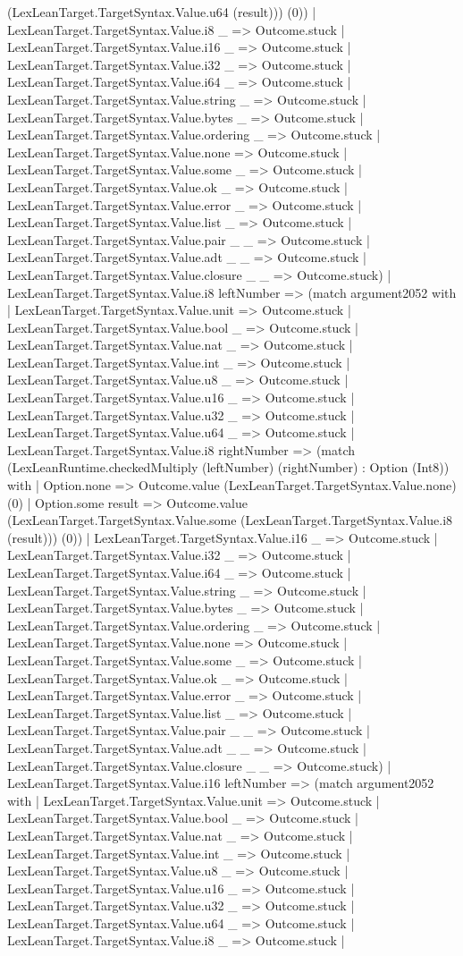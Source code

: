 \documentclass[11pt]{article}
\begin{document}
(LexLeanTarget.TargetSyntax.Value.u64 (result))) (0)) | LexLeanTarget.TargetSyntax.Value.i8 \_ => Outcome.stuck | LexLeanTarget.TargetSyntax.Value.i16 \_ => Outcome.stuck | LexLeanTarget.TargetSyntax.Value.i32 \_ => Outcome.stuck | LexLeanTarget.TargetSyntax.Value.i64 \_ => Outcome.stuck | LexLeanTarget.TargetSyntax.Value.string \_ => Outcome.stuck | LexLeanTarget.TargetSyntax.Value.bytes \_ => Outcome.stuck | LexLeanTarget.TargetSyntax.Value.ordering \_ => Outcome.stuck | LexLeanTarget.TargetSyntax.Value.none => Outcome.stuck | LexLeanTarget.TargetSyntax.Value.some \_ => Outcome.stuck | LexLeanTarget.TargetSyntax.Value.ok \_ => Outcome.stuck | LexLeanTarget.TargetSyntax.Value.error \_ => Outcome.stuck | LexLeanTarget.TargetSyntax.Value.list \_ => Outcome.stuck | LexLeanTarget.TargetSyntax.Value.pair \_ \_ => Outcome.stuck | LexLeanTarget.TargetSyntax.Value.adt \_ \_ => Outcome.stuck | LexLeanTarget.TargetSyntax.Value.closure \_ \_ => Outcome.stuck) | LexLeanTarget.TargetSyntax.Value.i8 leftNumber => (match argument2052 with | LexLeanTarget.TargetSyntax.Value.unit => Outcome.stuck | LexLeanTarget.TargetSyntax.Value.bool \_ => Outcome.stuck | LexLeanTarget.TargetSyntax.Value.nat \_ => Outcome.stuck | LexLeanTarget.TargetSyntax.Value.int \_ => Outcome.stuck | LexLeanTarget.TargetSyntax.Value.u8 \_ => Outcome.stuck | LexLeanTarget.TargetSyntax.Value.u16 \_ => Outcome.stuck | LexLeanTarget.TargetSyntax.Value.u32 \_ => Outcome.stuck | LexLeanTarget.TargetSyntax.Value.u64 \_ => Outcome.stuck | LexLeanTarget.TargetSyntax.Value.i8 rightNumber => (match (LexLeanRuntime.checkedMultiply (leftNumber) (rightNumber) : Option (Int8)) with | Option.none => Outcome.value (LexLeanTarget.TargetSyntax.Value.none) (0) | Option.some result => Outcome.value (LexLeanTarget.TargetSyntax.Value.some (LexLeanTarget.TargetSyntax.Value.i8 (result))) (0)) | LexLeanTarget.TargetSyntax.Value.i16 \_ => Outcome.stuck | LexLeanTarget.TargetSyntax.Value.i32 \_ => Outcome.stuck | LexLeanTarget.TargetSyntax.Value.i64 \_ => Outcome.stuck | LexLeanTarget.TargetSyntax.Value.string \_ => Outcome.stuck | LexLeanTarget.TargetSyntax.Value.bytes \_ => Outcome.stuck | LexLeanTarget.TargetSyntax.Value.ordering \_ => Outcome.stuck | LexLeanTarget.TargetSyntax.Value.none => Outcome.stuck | LexLeanTarget.TargetSyntax.Value.some \_ => Outcome.stuck | LexLeanTarget.TargetSyntax.Value.ok \_ => Outcome.stuck | LexLeanTarget.TargetSyntax.Value.error \_ => Outcome.stuck | LexLeanTarget.TargetSyntax.Value.list \_ => Outcome.stuck | LexLeanTarget.TargetSyntax.Value.pair \_ \_ => Outcome.stuck | LexLeanTarget.TargetSyntax.Value.adt \_ \_ => Outcome.stuck | LexLeanTarget.TargetSyntax.Value.closure \_ \_ => Outcome.stuck) | LexLeanTarget.TargetSyntax.Value.i16 leftNumber => (match argument2052 with | LexLeanTarget.TargetSyntax.Value.unit => Outcome.stuck | LexLeanTarget.TargetSyntax.Value.bool \_ => Outcome.stuck | LexLeanTarget.TargetSyntax.Value.nat \_ => Outcome.stuck | LexLeanTarget.TargetSyntax.Value.int \_ => Outcome.stuck | LexLeanTarget.TargetSyntax.Value.u8 \_ => Outcome.stuck | LexLeanTarget.TargetSyntax.Value.u16 \_ => Outcome.stuck | LexLeanTarget.TargetSyntax.Value.u32 \_ => Outcome.stuck | LexLeanTarget.TargetSyntax.Value.u64 \_ => Outcome.stuck | LexLeanTarget.TargetSyntax.Value.i8 \_ => Outcome.stuck | 
\end{document}
